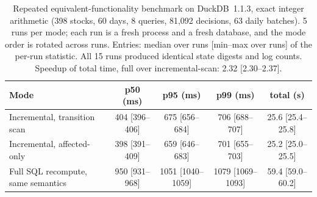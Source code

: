 \begin{table}[t]\centering\caption{Repeated equivalent-functionality benchmark on DuckDB~1.1.3, exact integer arithmetic (398 stocks, 60 days, 8 queries, 81,092 decisions, 63 daily batches). 5 runs per mode; each run is a fresh process and a fresh database, and the mode order is rotated across runs. Entries: median over runs [min--max over runs] of the per-run statistic. All 15 runs produced identical state digests and log counts. Speedup of total time, full over incremental-scan: 2.32 [2.30--2.37].}\label{tab:cqp}
\scriptsize\setlength{\tabcolsep}{1.5pt}\begin{tabular}{lcccc}\toprule
Mode & p50 (ms) & p95 (ms) & p99 (ms) & total (s)\\
\midrule
Incremental, transition scan & 404 [396--406] & 675 [656--684] & 706 [688--707] & 25.6 [25.4--25.8]\\
Incremental, affected-only & 398 [391--409] & 659 [646--683] & 701 [655--703] & 25.2 [25.0--25.5]\\
Full SQL recompute, same semantics & 950 [931--968] & 1051 [1040--1059] & 1079 [1069--1093] & 59.4 [59.0--60.2]\\
\bottomrule\end{tabular}\end{table}
